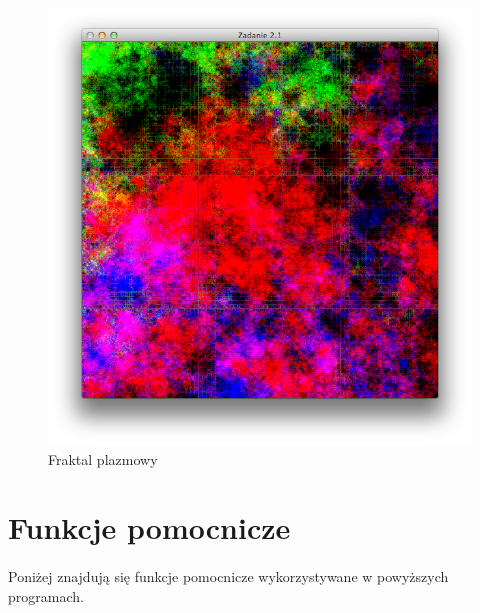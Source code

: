 \documentclass[wide,a4paper,titlepage,12pt] {article}
\begin{document}
  

  \begin{figure}[htbp]
    \begin{center}
      \includegraphics[scale=0.6]{fraktal.png}
      \caption{Fraktal plazmowy}
    \end{center}
  \end{figure}

  \newpage

  \section{Funkcje pomocnicze}
  \paragraph{}
  Poniżej znajdują się funkcje pomocnicze wykorzystywane w powyższych programach.
  \paragraph{}
  
\end{document}
